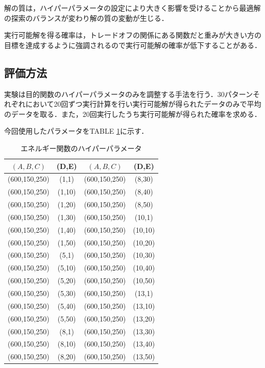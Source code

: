 \documentclass[conference]{IEEEtran}
\begin{document}
解の質は，ハイパーパラメータの設定により大きく影響を受けることから最適解の探索のバランスが変わり解の質の変動が生じる．

実行可能解を得る確率は，トレードオフの関係にある関数だと重みが大きい方の目標を達成するように強調されるので実行可能解の確率が低下することがある．
\subsection{評価方法}
実験は目的関数のハイパーパラメータのみを調整する手法を行う．30パターンそれぞれにおいて20回ずつ実行計算を行い実行可能解が得られたデータのみで平均のデータを取る．また，20回実行したうち実行可能解が得られた確率を求める．

今回使用したパラメータをTABLE \ref{parameter}に示す．

\begin{table}[h]
\centering
\caption{エネルギー関数のハイパーパラメータ}
\label{parameter}
\begin{tabular}{|c|c|@{\hskip 10pt}|c|c|}
    \hline
    $(A,B,C)$ & (D,E) & $(A,B,C)$ & (D,E) \\ \hline
    (600,150,250) & (1,1) & (600,150,250) & (8,30) \\ \hline
    (600,150,250) & (1,10) & (600,150,250) & (8,40) \\ \hline
    (600,150,250) & (1,20) & (600,150,250) & (8,50) \\ \hline
    (600,150,250) & (1,30) & (600,150,250) & (10,1) \\ \hline
    (600,150,250) & (1,40) & (600,150,250) & (10,10) \\ \hline
    (600,150,250) & (1,50) & (600,150,250) & (10,20) \\ \hline
    (600,150,250) & (5,1) & (600,150,250) & (10,30) \\ \hline
    (600,150,250) & (5,10) & (600,150,250) & (10,40) \\ \hline
    (600,150,250) & (5,20) & (600,150,250) & (10,50) \\ \hline
    (600,150,250) & (5,30) & (600,150,250) & (13,1) \\ \hline
    (600,150,250) & (5,40) & (600,150,250) & (13,10) \\ \hline
    (600,150,250) & (5,50) & (600,150,250) & (13,20) \\ \hline
    (600,150,250) & (8,1) & (600,150,250) & (13,30) \\ \hline
    (600,150,250) & (8,10) & (600,150,250) & (13,40) \\ \hline
    (600,150,250) & (8,20) & (600,150,250) & (13,50) \\ \hline
\end{tabular}
\end{table}
\end{document}
